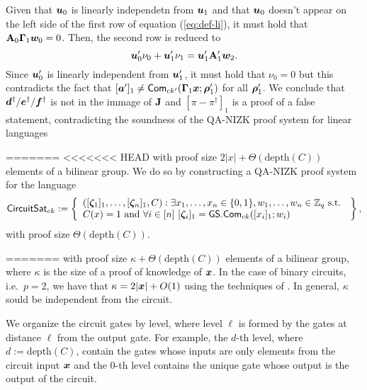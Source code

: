 Given that ${\boldsymbol{u}}_{0}$ is linearly independetn from ${\boldsymbol{u}}_{1}$ and that ${\boldsymbol{u}}_{0}$ doesn't appear on the left side of the first row of equation (\ref{eq:def-li}), it must hold that $\mathbf{{A}}_0\mathbf{{\Gamma}}_1{\boldsymbol{w}}_{0}=0$. Then, the second row is reduced to
$$
{\boldsymbol{u}}'_{0}\nu_{0} + {\boldsymbol{u}}'_1\nu_1 = {\boldsymbol{u}}'_1\mathbf{{A}}'_1{\boldsymbol{w}}_{2}.
$$
Since ${\boldsymbol{u}}'_0$ is linearly independent from ${\boldsymbol{u}}'_1$, it must hold that $\nu_0=0$ but this contradicts the fact that $[{\boldsymbol{a}}']_1\neq\mathsf{Com}_{ck'}(\mathbf{{\Gamma}}_1{\boldsymbol{x}};{\boldsymbol{\rho}}'_1)$ for all ${\boldsymbol{\rho}}'_1$. We conclude that ${\boldsymbol{d}}^\dag/{\boldsymbol{e}}^\dag/{\boldsymbol{f}}^\dag$ is not in the immage of $\mathbf{{J}}$ and $[\pi-\pi^\dag]_1$ is a proof of a false statement, contradicting the soundness of the QA-NIZK proof system for linear languages

=======
<<<<<<< HEAD
with proof size $2|x|+\Theta(\mathrm{depth}(C))$ elements of a bilinear group. We do so by constructing a QA-NIZK proof system for the language
\[
\mathsf{CircuitSat}_{ck}:=\left\{\begin{array}{l}
([\grkb{\zeta}_1]_1,\ldots,[\grkb{\zeta}_n]_1,C):\exists x_1,\ldots,x_n\in\bits,w_1,\ldots,w_n\in\Z_q \text{ s.t. } \\
C(x)=1 \text{ and } \forall i\in [n]\ [\grkb{\zeta}_i]_1=\GS.\Com_{ck}([x_i]_1;w_i)
\end{array}\right\},
\]
with proof size $\Theta(\mathrm{depth}(C))$.

=======
with proof size $\kappa+\Theta(\mathrm{depth}(C))$ elements of a bilinear group, where $\kappa$ is the size of a proof of knowledge of ${\boldsymbol{x}}$. In the case of binary circuits, i.e.~$p=2$, we have that $\kappa=2|{\boldsymbol{x}}|+O(1)$ using the techniques of \cite{AC:GonHevRaf15}. In general, $\kappa$ sould be independent from the circuit.


We organize the circuit gates by level, where level $\ell$ is formed by the gates at distance $\ell$ from the output gate. For example, the $d$-th level, where $d:=\mathrm{depth}({C})$, contain the gates whose inputs are only elements from the circuit input ${\boldsymbol{x}}$ and the $0$-th level contains the unique gate whose output is the output of the circuit.

